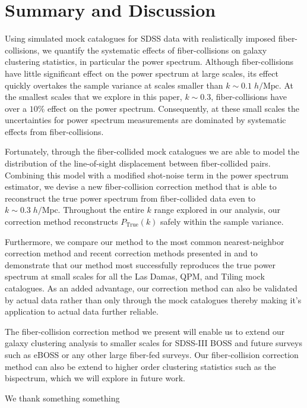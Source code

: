 \documentclass{emulateapj}
\begin{document}
\section{Summary and Discussion} \label{sec:summary}
Using simulated mock catalogues for SDSS data with realistically imposed fiber-collisions, we quantify the systematic effects of fiber-collisions on galaxy clustering statistics, in particular the power spectrum. Although fiber-collisions have little significant effect on the power spectrum at large scales, its effect quickly overtakes the sample variance at scales smaller than $k \sim 0.1 \;h/\mathrm{Mpc}$. At the smallest scales that we explore in this paper, $k \sim 0.3$, fiber-collisions have over a $10 \%$ effect on the power spectrum. Consequently, at these small scales the uncertainties for power spectrum measurements are dominated by systematic effects from fiber-collisions. 

Fortunately, through the fiber-collided mock catalogues we are able to model the distribution of the line-of-sight displacement between fiber-collided pairs. Combining this model with a modified shot-noise term in the power spectrum estimator, we devise a new fiber-collision correction method that is able to reconstruct the true power spectrum from fiber-collided data even to $k \sim 0.3 \;h/\mathrm{Mpc}$. Throughout the entire $k$ range explored in our analysis, our correction method reconstructs $P_\mathrm{True}(k)$ safely within the sample variance. 

Furthermore, we compare our method to the most common nearest-neighbor correction method and recent correction methods presented in \cite{Beutler:2014aa} and \cite{Gil-Marin:2014aa} to demonstrate that our method most successfully reproduces the true power spectrum at small scales for all the Las Damas, QPM, and Tiling mock catalogues. As an added advantage, our correction method can also be validated by actual data rather than only through the mock catalogues thereby making it's application to actual data further reliable. 

The fiber-collision correction method we present will enable us to extend our galaxy clustering analysis to smaller scales for SDSS-III BOSS and future surveys such as eBOSS or any other large fiber-fed surveys. Our fiber-collision correction method can also be extend to higher order clustering statistics such as the bispectrum, which we will explore in future work. 

\bigskip
We thank something something



\end{document}
